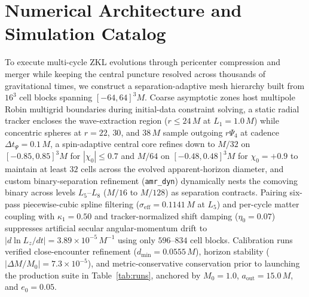 \documentclass[aps,prl,twocolumn,10pt,superscriptaddress,nofootinbib,longbibliography,floatfix]{revtex4-2}
\newcommand{\chizero}{\chi_0}
\newcommand{\aout}{a_{\mathrm{out}}}
\newcommand{\rPsifour}{r\Psi_4}
\begin{document}
\section{Numerical Architecture and Simulation Catalog}
To execute multi-cycle ZKL evolutions through pericenter compression and merger while keeping the central puncture resolved across thousands of gravitational times, we construct a separation-adaptive mesh hierarchy built from $16^3$ cell blocks spanning $[-64, 64]^3 M$. Coarse asymptotic zones host multipole Robin multigrid boundaries during initial-data constraint solving, a static radial tracker encloses the wave-extraction region ($r \le 24\,M$ at $L_1 = 1.0\,M$) while concentric spheres at $r = 22$, $30$, and $38\,M$ sample outgoing $\rPsifour$ at cadence $\Delta t_{\Psi} = 0.1\,M$, a spin-adaptive central core refines down to $M/32$ on $[-0.85, 0.85]^3 M$ for $|\chizero| \le 0.7$ and $M/64$ on $[-0.48, 0.48]^3 M$ for $\chizero = +0.9$ to maintain at least $32$ cells across the evolved apparent-horizon diameter, and custom binary-separation refinement (\texttt{amr\_dyn}) dynamically nests the comoving binary across levels $L_5$--$L_8$ ($M/16$ to $M/128$) as separation contracts. Pairing six-pass piecewise-cubic spline filtering ($\sigma_{\mathrm{eff}} = 0.1141\,M$ at $L_5$) and per-cycle matter coupling with $\kappa_1 = 0.50$ and tracker-normalized shift damping ($\eta_0 = 0.07$) suppresses artificial secular angular-momentum drift to $|d\ln L_z/dt| = 3.89\times 10^{-5}\,M^{-1}$ using only $596$--$834$ cell blocks. Calibration runs verified close-encounter refinement ($d_{\min} = 0.0555\,M$), horizon stability ($|\Delta M/M_0| = 7.3\times 10^{-5}$), and metric-conservative conservation prior to launching the production suite in Table~\ref{tab:runs}, anchored by $M_0 = 1.0$, $\aout = 15.0\,M$, and $e_0 = 0.05$.
\end{document}
